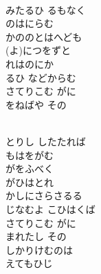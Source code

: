 \documentclass[10pt,b5j]{tarticle} %
\begin{document}
\begin{enumerate}
\begin{minipage}[c]{\blocksize}
        \vspace{\linespace}
        \item~\\
        みたるひ るもなく\\
        のはにらむ\\
        かののとはへども\\
        (よ)につをずと\\
        れはのにか\\
        るひ などからむ\\
        さてりこむ がに\\
        をねばや その
        
        \vspace{\linespace}
        \item~\\
        とりし したたれば\\
        もはをがむ\\
        がをふべく\\
        がひはとれ\\
        かしにさらさるる\\
        じなむよ こひはくば\\
        さてりこむ がに\\
        まれたし その\\
        しかりけむのは\\
        えてもひじ
    
    \end{minipage}
\end{enumerate} %
\end{document}
